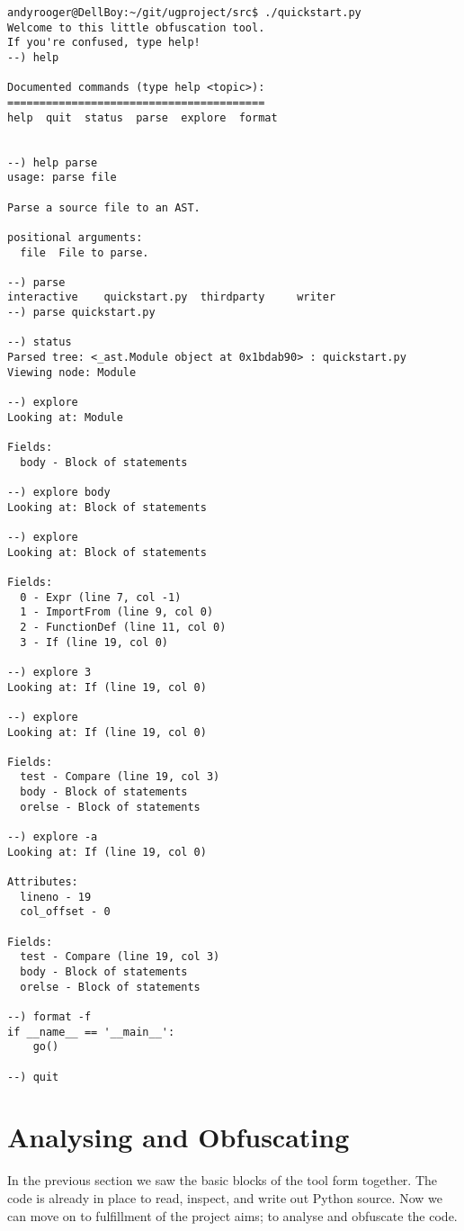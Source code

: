 \documentclass{report}
\begin{document}
\begin{lstlisting}[language=obftool,basicstyle=\small]
andyrooger@DellBoy:~/git/ugproject/src$ ./quickstart.py 
Welcome to this little obfuscation tool.
If you're confused, type help!
--) help

Documented commands (type help <topic>):
========================================
help  quit  status  parse  explore  format


--) help parse
usage: parse file

Parse a source file to an AST.

positional arguments:
  file  File to parse.

--) parse 
interactive    quickstart.py  thirdparty     writer         
--) parse quickstart.py

--) status
Parsed tree: <_ast.Module object at 0x1bdab90> : quickstart.py
Viewing node: Module

--) explore
Looking at: Module

Fields:
  body - Block of statements

--) explore body
Looking at: Block of statements

--) explore
Looking at: Block of statements

Fields:
  0 - Expr (line 7, col -1)
  1 - ImportFrom (line 9, col 0)
  2 - FunctionDef (line 11, col 0)
  3 - If (line 19, col 0)

--) explore 3
Looking at: If (line 19, col 0)

--) explore
Looking at: If (line 19, col 0)

Fields:
  test - Compare (line 19, col 3)
  body - Block of statements
  orelse - Block of statements

--) explore -a
Looking at: If (line 19, col 0)

Attributes:
  lineno - 19
  col_offset - 0

Fields:
  test - Compare (line 19, col 3)
  body - Block of statements
  orelse - Block of statements

--) format -f
if __name__ == '__main__':
    go()

--) quit
\end{lstlisting}

\section{Analysing and Obfuscating}

In the previous section we saw the basic blocks of the tool form together. The code
is already in place to read, inspect, and write out Python source. Now we can move
on to fulfillment of the project aims; to analyse and obfuscate the code.
\end{document}

